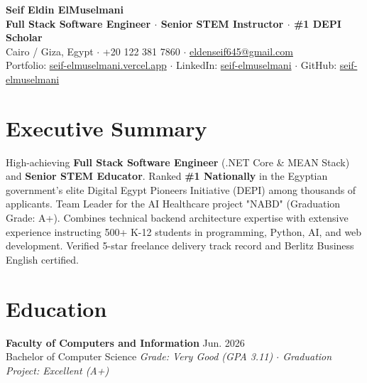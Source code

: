 \documentclass[11pt,a4paper]{article}
\begin{document}
\begin{center}
    {\huge \textbf{Seif Eldin ElMuselmani}} \\ \vspace{1.5mm}
    {\large \textbf{Full Stack Software Engineer $\cdot$ Senior STEM Instructor $\cdot$ \#1 DEPI Scholar}} \\ \vspace{1mm}
    Cairo / Giza, Egypt $\cdot$ +20 122 381 7860 $\cdot$ \href{mailto:eldenseif645@gmail.com}{eldenseif645@gmail.com} \\
    Portfolio: \href{https://seif-elmuselmani.vercel.app}{seif-elmuselmani.vercel.app} $\cdot$ LinkedIn: \href{https://linkedin.com/in/seif-elmuselmani}{seif-elmuselmani} $\cdot$ GitHub: \href{https://github.com/seif-elmuselmani}{seif-elmuselmani}
\end{center}

\vspace{-2.5mm}
\section{Executive Summary}
High-achieving \textbf{Full Stack Software Engineer} (.NET Core \& MEAN Stack) and \textbf{Senior STEM Educator}. Ranked \textbf{\#1 Nationally} in the Egyptian government's elite Digital Egypt Pioneers Initiative (DEPI) among thousands of applicants. Team Leader for the AI Healthcare project "NABD" (Graduation Grade: A+). Combines technical backend architecture expertise with extensive experience instructing 500+ K-12 students in programming, Python, AI, and web development. Verified 5-star freelance delivery track record and Berlitz Business English certified.

\section{Education}
\textbf{Faculty of Computers and Information} \hfill Jun. 2026 \\
Bachelor of Computer Science \hfill \textit{Grade: Very Good (GPA 3.11) $\cdot$ Graduation Project: Excellent (A+)}

\end{document}
